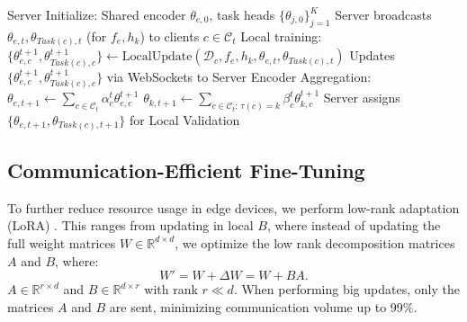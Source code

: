 \begin{algorithm}
\caption{RT-FedMTL: Real-time federated MTL}
\label{alg:rt_fedmtl}
\begin{algorithmic}[1]
\STATE Server Initialize: Shared encoder $\theta_{e,0}$, task heads $\{\theta_{j,0}\}_{j=1}^K$
    \STATE Server broadcasts $\theta_{e,t}, \theta_{Task(c),t}$ (for $f_e, h_k$) to clients $c \in \mathcal{C}_t$
        \STATE Local training: $\{\theta_{e,c}^{t+1}, \theta_{Task(c),c}^{t+1}\} \leftarrow \text{LocalUpdate}(\mathcal{D}_c, f_e, h_k, \theta_{e,t}, \theta_{Task(c),t})$ 
        \STATE Updates $\{\theta_{e,c}^{t+1}, \theta_{Task(c),c}^{t+1}\}$ via WebSockets to Server
    \ENDFOR
    \STATE Encoder Aggregation:
    \STATE \quad $\theta_{e,t+1} \leftarrow \sum_{c\in\mathcal{C}_t} \alpha_c^t \theta_{e,c}^{t+1}$ 
        \STATE $\theta_{k,t+1} \leftarrow \sum_{c \in\mathcal{C}_t: \, \tau(c)=k} \beta_c^t \theta_{k,c}^{t+1}$ 
    \ENDFOR
    \STATE Server assigns $\{\theta_{e,t+1}, \theta_{Task(c),t+1}\}$ for Local Validation
\ENDFOR
\end{algorithmic}
\end{algorithm}

\subsection{Communication-Efficient Fine-Tuning}
To further reduce resource usage in edge devices, we perform low-rank adaptation (LoRA) \cite{hu2022lora}. This ranges from updating in local $B$, where instead of updating the full weight matrices $W \in \mathbb{R}^{d \times d}$, we optimize the low rank decomposition matrices $A$ and $B$, where:
\begin{equation} \label{eq:lora_decomposition}
    W' = W + \Delta W = W + BA.
\end{equation}
$A \in \mathbb{R}^{r \times d}$ and $B \in \mathbb{R}^{d \times r}$ with rank $r \ll d$. When performing big updates, only the matrices $A$ and $B$ are sent, minimizing communication volume up to 99\%.